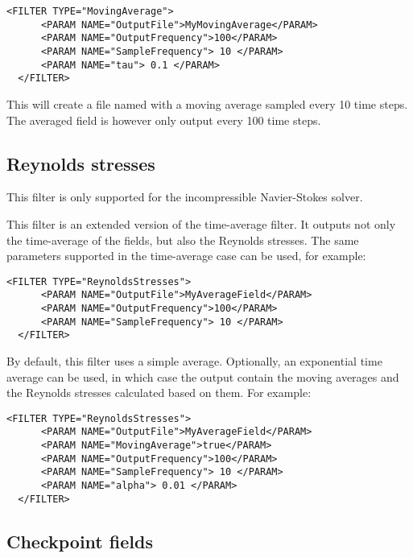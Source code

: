 \begin{lstlisting}[style=XMLStyle,gobble=2]
  <FILTER TYPE="MovingAverage">
      <PARAM NAME="OutputFile">MyMovingAverage</PARAM>
      <PARAM NAME="OutputFrequency">100</PARAM>
      <PARAM NAME="SampleFrequency"> 10 </PARAM>
      <PARAM NAME="tau"> 0.1 </PARAM>
  </FILTER>
\end{lstlisting}

This will create a file named  with a moving average
sampled every 10 time steps. The averaged field is however only
output every 100 time steps.

\subsection{Reynolds stresses}

\begin{notebox}
  This filter is only supported for the incompressible Navier-Stokes solver.
\end{notebox}

This filter is an extended version of the time-average filter. It outputs
not only the time-average of the fields, but also the Reynolds stresses.
The same parameters supported in the time-average case can be used,
for example:

\begin{lstlisting}[style=XMLStyle,gobble=2]
  <FILTER TYPE="ReynoldsStresses">
      <PARAM NAME="OutputFile">MyAverageField</PARAM>
      <PARAM NAME="OutputFrequency">100</PARAM>
      <PARAM NAME="SampleFrequency"> 10 </PARAM>
  </FILTER>
\end{lstlisting}

By default, this filter uses a simple average. Optionally, an exponential
time average can be used, in which case the output contain the moving
averages and the Reynolds stresses calculated based on them. For example:

\begin{lstlisting}[style=XMLStyle,gobble=2]
  <FILTER TYPE="ReynoldsStresses">
      <PARAM NAME="OutputFile">MyAverageField</PARAM>
      <PARAM NAME="MovingAverage">true</PARAM>
      <PARAM NAME="OutputFrequency">100</PARAM>
      <PARAM NAME="SampleFrequency"> 10 </PARAM>
      <PARAM NAME="alpha"> 0.01 </PARAM>
  </FILTER>
\end{lstlisting}

\subsection{Checkpoint fields}
 
